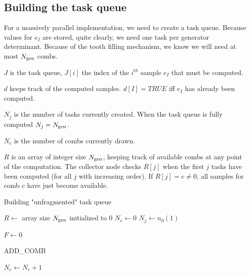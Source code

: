\documentclass[./thesis.tex]{subfiles}
\begin{document}
\subsection{Building the task queue}

For a massively parallel implementation, we need to create a task queue. Because values for $e_I$ are stored, quite clearly, we need one task per generator determinant. Because of the tooth filling mechanism, we know we will need at most ${N_\text{gen}}$ combs.
\begin{description}
\item{$J$} is the task queue, $J[i]$ the index of the $i^{th}$ sample $e_I$ that must be computed.
\item{$d$} keeps track of the computed samples. $d[I] = TRUE$ iff $e_I$ has already been computed.
\item{$N_j$} is the number of tasks currently created. When the task queue is fully computed $N_j = {N_\text{gen}}$.
\item{$N_c$} is the number of combs currently drawn.
\item{$R$} is an array of integer size ${N_\text{gen}}$, keeping track of available combs at any point of the computation. The collector node checks $R[j]$ when the first $j$ tasks have been computed (for all $j$ with increasing order). If $R[j] = c \neq 0$, all samples for comb $c$ have just become available. 
\end{description}



\begin{algorithm}
	\caption{Building "unfragmented" task queue}
	\label{alg:TASK_QUEUE}
	$R \gets $ array size ${N_\text{gen}}$ initialized to 0 \;
	$N_c \gets 0$ \;
	$N_j \gets n_0(1)$ \;
	
	
	\For{$i=1,\Ngen$}{
		$u[i] \gets $ random value in $[0,1)_\mathbb{R}$ \;	
	}
	$F \gets 0$ \;	
\end{algorithm}

\begin{algorithm}
	\caption{ADD\_COMB}
	\label{alg:ADD_COMB}
		$N_c \gets N_c + 1$ \;
\end{algorithm}
\end{document}
